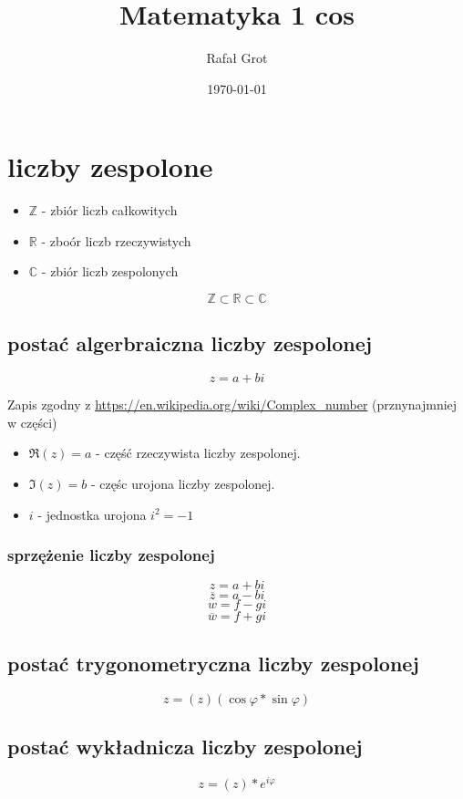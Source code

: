 \documentclass[11pt]{article}
\author{Rafał Grot}
\date{\today}
\title{Matematyka 1 cos}
\begin{document}
\maketitle
\tableofcontents


\section{liczby zespolone}
\label{sec:org4048eae}
\begin{itemize}
\item \(\mathbb{Z}\) - zbiór liczb całkowitych
\item \(\mathbb{R}\) - zboór liczb rzeczywistych
\item \(\mathbb{C}\) - zbiór liczb zespolonych
\end{itemize}
$$\mathbb{Z} \subset \mathbb{R} \subset \mathbb{C}$$
\subsection{postać algerbraiczna liczby zespolonej}
\label{sec:org0aa5d27}
$$z=a+bi$$

Zapis zgodny z \url{https://en.wikipedia.org/wiki/Complex\_number} (prznynajmniej w części)
\begin{itemize}
\item \(\Re(z) = a\) - część rzeczywista liczby zespolonej.
\item \(\Im(z) = b\) - częśc urojona liczby zespolonej.
\item \(i\) - jednostka urojona \(i^2=-1\)
\end{itemize}
\subsubsection{sprzężenie liczby zespolonej}
\label{sec:org43b75b4}
$$z=a+bi$$
$$\overline{z}=a-bi$$
$$w=f-gi$$
$$\overline{w}=f+gi$$
\subsection{postać trygonometryczna liczby zespolonej}
\label{sec:org2180eab}
$$z=(z)(\cos\varphi*\sin\varphi)$$
\subsection{postać wykładnicza liczby zespolonej}
\label{sec:org9f29046}
$$z=(z)*e^{i\varphi}$$
\end{document}
